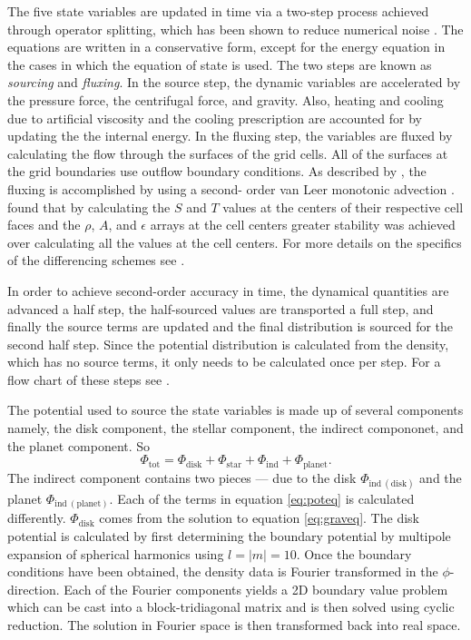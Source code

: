The five state variables are updated in time via a two-step process achieved through operator splitting, which has been shown to reduce numerical noise \citep{williamsphd1988,yangphd1992}. The equations are written in a conservative form, except for the energy equation in the cases in which the  equation of state is used. The two steps are known as {\it sourcing} and {\it fluxing}. In the source step, the dynamic variables are accelerated by the pressure force, the centrifugal force, and gravity. Also, heating and cooling due to artificial viscosity and the cooling prescription are accounted for by updating the the internal energy. In the fluxing step, the variables are fluxed by calculating the flow through the surfaces of the grid cells. All of the surfaces at the grid boundaries use outflow boundary conditions. As described by \citet{yangphd1992}, the fluxing is accomplished by using a second- order van Leer monotonic advection \citep{vanleer1979}.  \citet{yangphd1992} found that by calculating the $S$ and $T$ values at the centers of their respective cell faces and the $\rho$, $A$, and $\epsilon$ arrays at the cell centers greater stability was achieved over calculating all the values at the cell centers. For more details on the specifics of the differencing schemes see \citet{pickettphd1995}.

In order to achieve second-order accuracy in time, the dynamical quantities are advanced a half step, the half-sourced values are transported a full step, and finally the source terms are updated and the final distribution is sourced for the second half step. Since the potential distribution is calculated from the density, which has no source terms, it only needs to be calculated once per step. For a flow chart of these steps see \citet{mejiaphd2004,boleyphd2007}.

The potential used to source the state variables is made up of several components namely, the disk component, the stellar component, the indirect compononet, and the planet component. So 
\begin{equation}
\Phi_{\mathrm{tot}} = \Phi_{\mathrm{disk}} + \Phi_{\mathrm{star}} + \Phi_{\mathrm{ind}} + \Phi_{\mathrm{planet}}. \label{eq:poteq}
\end{equation} 
The indirect component contains two pieces --- due to the disk $\Phi_{\mathrm{ind~(disk)}}$ and the planet $\Phi_{\mathrm{ind~(planet)}}$. 
Each of the terms in equation \eqref{eq:poteq} is calculated differently. $\Phi_{\mathrm{disk}}$ comes from the solution to equation \eqref{eq:graveq}. The disk potential is calculated by first determining the boundary potential by multipole expansion of spherical harmonics using $l = |m| = 10$. Once the boundary conditions have been obtained, the density data is Fourier transformed in the $\phi$-direction. Each of the Fourier components yields a 2D boundary value problem which can be cast into a block-tridiagonal matrix and is then solved using cyclic reduction. The solution in Fourier space is then transformed back into real space. 

